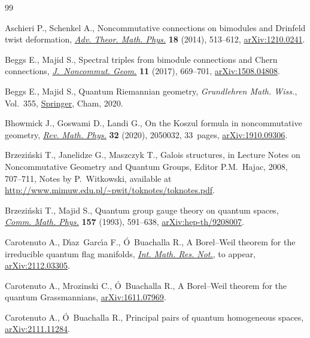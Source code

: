 \documentclass[pdftex]{sigma}
\numberwithin{equation}{section}
\begin{document}
\begin{thebibliography}{99}
\footnotesize\itemsep=0pt

Aschieri P., Schenkel A., Noncommutative connections on bimodules and
 {D}rinfeld twist deformation, \href{https://doi.org/10.4310/ATMP.2014.v18.n3.a1}{\textit{Adv. Theor. Math. Phys.}} \textbf{18}
 (2014), 513--612, \href{https://arxiv.org/abs/1210.0241}{arXiv:1210.0241}.

Beggs E., Majid S., Spectral triples from bimodule connections and {C}hern
 connections, \href{https://doi.org/10.4171/JNCG/11-2-7}{\textit{J.~Noncommut. Geom.}} \textbf{11} (2017), 669--701,
 \href{https://arxiv.org/abs/1508.04808}{arXiv:1508.04808}.

Beggs E., Majid S., Quantum {R}iemannian geometry, \textit{Grundlehren Math.
 Wiss.}, Vol.~355, \href{https://doi.org/10.1007/978-3-030-30294-8}{Springer}, Cham, 2020.

Bhowmick J., Goswami D., Landi G., On the {K}oszul formula in noncommutative
 geometry, \href{https://doi.org/10.1142/S0129055X20500324}{\textit{Rev. Math. Phys.}} \textbf{32} (2020), 2050032, 33~pages,
 \href{https://arxiv.org/abs/1910.09306}{arXiv:1910.09306}.

Brzezi\'nski T., Janelidze G., Maszczyk T., Galois structures, in Lecture Notes
 on Noncommutative Geometry and Quantum Groups, Editor P.M.~Hajac, 2008,
 707--711, {N}otes by P.~Witkowski, available at
 \url{http://www.mimuw.edu.pl/~pwit/toknotes/toknotes.pdf}.

Brzezi\'nski T., Majid S., Quantum group gauge theory on quantum spaces,
 \href{https://doi.org/10.1007/BF02096884}{\textit{Comm. Math. Phys.}} \textbf{157} (1993), 591--638,
 \href{https://arxiv.org/abs/hep-th/9208007}{arXiv:hep-th/9208007}.

Carotenuto A., D\'{\i}az~Garc\'{\i}a F., \'O~Buachalla R., A {B}orel--{W}eil
 theorem for the irreducible quantum flag manifolds, \href{https://doi.org/10.1093/imrn/rnac193}{\textit{Int. Math. Res.
 Not.}}, {t}o appear, \href{https://arxiv.org/abs/2112.03305}{arXiv:2112.03305}.

Carotenuto A., Mrozinski C., \'O~Buachalla R., A {B}orel--{W}eil theorem for
 the quantum {G}rassmannians, \href{https://arxiv.org/abs/1611.07969}{arXiv:1611.07969}.

Carotenuto A., \'O~Buachalla R., Principal pairs of quantum homogeneous spaces,
 \href{https://arxiv.org/abs/2111.11284}{arXiv:2111.11284}.


\end{thebibliography}
\end{document}
